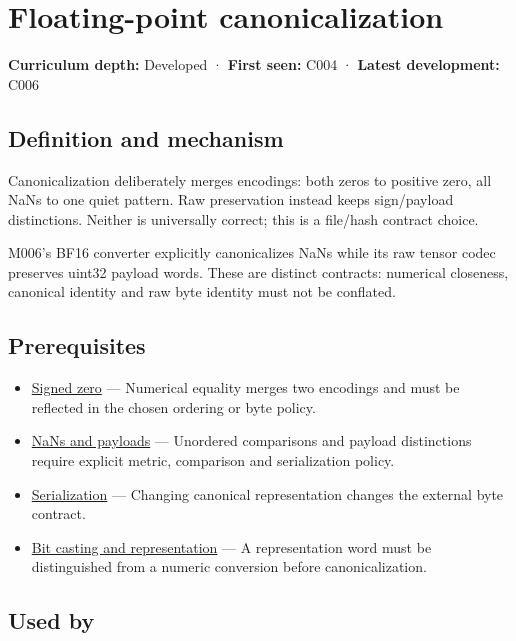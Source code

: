 \hypertarget{appendix-e90053a4b201}{}\label{referencestart:appendix-e90053a4b201}
\section{Floating-point canonicalization}\label{appendix-e90053a4b201-floating-point-canonicalization}

\textbf{Curriculum depth:} Developed · \textbf{First seen:} C004 · \textbf{Latest development:} C006

\subsection{Definition and mechanism}\label{appendix-e90053a4b201-definition-and-mechanism}

Canonicalization deliberately merges encodings: both zeros to positive zero, all NaNs to one quiet pattern. Raw preservation instead keeps sign/payload distinctions. Neither is universally correct; this is a file/hash contract choice.

M006's BF16 converter explicitly canonicalizes NaNs while its raw tensor codec preserves uint32 payload words. These are distinct contracts: numerical closeness, canonical identity and raw byte identity must not be conflated.

\subsection{Prerequisites}\label{appendix-e90053a4b201-prerequisites}

\begin{itemize}
\tightlist
\item
  \hyperref[appendix-3a048f032c1f]{Signed zero} --- Numerical equality merges two encodings and must be reflected in the chosen ordering or byte policy.
\item
  \hyperref[appendix-d6607cc4c235]{NaNs and payloads} --- Unordered comparisons and payload distinctions require explicit metric, comparison and serialization policy.
\item
  \hyperref[appendix-91d09ebed979]{Serialization} --- Changing canonical representation changes the external byte contract.
\item
  \hyperref[appendix-34ee45f161c1]{Bit casting and representation} --- A representation word must be distinguished from a numeric conversion before canonicalization.
\end{itemize}

\subsection{Used by}\label{appendix-e90053a4b201-used-by}

